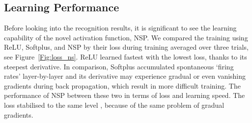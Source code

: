 	\subsection{Learning Performance}
	\label{subsec:result_compare}
	Before looking into the recognition results, it is significant to see the learning capability of the novel activation function, NSP.
	We compared the training using ReLU, Softplus, and NSP by their loss during training averaged over three trials, see Figure~\ref{Fig:loss_ns}.
	ReLU learned fastest with the lowest loss, thanks to its steepest derivative.
	In comparison, Softplus accumulated spontaneous `firing rates' layer-by-layer and its derivative may experience gradual or even vanishing gradients during back propagation, which result in \DIFdelbegin {}\DIFdelend more difficult training.
	The performance of NSP \DIFdelbegin {}\DIFdelend \DIFaddbegin {}\DIFaddend between these two in terms of loss and learning speed.
	The loss stabilised to the same level \DIFdelbegin {}\DIFdelend \DIFaddbegin {}\DIFaddend , because of the same problem of gradual gradients.
	\DIFdelbegin {}\DIFdelend \DIFaddbegin 

